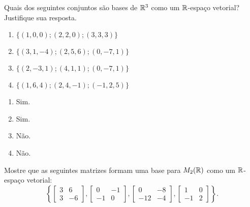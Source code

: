 \documentclass[12pt]{exam}
\begin{document}
    \begin{exercicio}
        Quais dos seguintes conjuntos são bases de $\mathbb{R}^3$ como um $\mathbb{R}$-espaço vetorial? Justifique sua resposta.
        \begin{multicols}{2}
            \begin{enumerate}[label={\alph*})]
                \item $\{(1, 0, 0); (2, 2, 0); (3, 3, 3)\}$
            
                \item $\{(3, 1, -4); (2, 5, 6); (0, -7, 1)\}$
            
                \item $\{(2, -3, 1); (4, 1, 1); (0, -7, 1)\}$
            
                \item $\{(1, 6, 4); (2, 4, -1); (-1, 2, 5)\}$
            \end{enumerate}
        \end{multicols}
        \begin{solucao}
            \begin{enumerate}[label={\alph*})]
                \item Sim.

                \item Sim.

                \item Não.

                \item Não.
            \end{enumerate}
        \end{solucao}
    \end{exercicio}

    \begin{exercicio}
        Mostre que as seguintes matrizes formam uma base para $M_2(\mathbb{R})$ como um $\mathbb{R}$-espaço vetorial:
        \[
            \left\{
                \begin{bmatrix}
                    3 & 6\\
                    3 & -6
                \end{bmatrix},
                \begin{bmatrix}
                    0 & -1\\
                    -1 & 0
                \end{bmatrix},
                \begin{bmatrix}
                    0 & -8\\
                    -12 & -4
                \end{bmatrix},
                \begin{bmatrix}
                    1 & 0\\
                    -1 & 2
                \end{bmatrix}
            \right\}.
        \]
    \end{exercicio}
\end{document}
